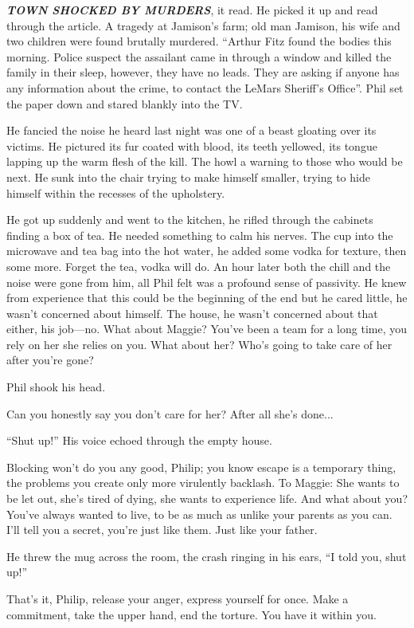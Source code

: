 \emph{\textbf{TOWN SHOCKED BY MURDERS}}, it read. He picked it up and
read through the article. A tragedy at Jamison's farm; old man Jamison,
his wife and two children were found brutally murdered. ``Arthur Fitz
found the bodies this morning. Police suspect the assailant came in
through a window and killed the family in their sleep, however, they
have no leads. They are asking if anyone has any information about the
crime, to contact the LeMars Sheriff's Office''. Phil set the paper down
and stared blankly into the TV.

He fancied the noise he heard last night was one of a beast gloating
over its victims. He pictured its fur coated with blood, its teeth
yellowed, its tongue lapping up the warm flesh of the kill. The howl a
warning to those who would be next. He sunk into the chair trying to
make himself smaller, trying to hide himself within the recesses of the
upholstery.

He got up suddenly and went to the kitchen, he rifled through the
cabinets finding a box of tea. He needed something to calm his nerves.
The cup into the microwave and tea bag into the hot water, he added some
vodka for texture, then some more. Forget the tea, vodka will do. An
hour later both the chill and the noise were gone from him, all Phil
felt was a profound sense of passivity. He knew from experience that
this could be the beginning of the end but he cared little, he wasn't
concerned about himself. The house, he wasn't concerned about that
either, his job---no. What about Maggie? You've been a team for a long
time, you rely on her she relies on you. What about her? Who's going to
take care of her after you're gone?

Phil shook his head.

Can you honestly say you don't care for her? After all she's done...

``Shut up!'' His voice echoed through the empty house.

Blocking won't do you any good, Philip; you know escape is a temporary
thing, the problems you create only more virulently backlash. To Maggie:
She wants to be let out, she's tired of dying, she wants to experience
life. And what about you? You've always wanted to live, to be as much as
unlike your parents as you can. I'll tell you a secret, you're just like
them. Just like your father.

He threw the mug across the room, the crash ringing in his ears, ``I
told you, shut up!''

That's it, Philip, release your anger, express yourself for once. Make a
commitment, take the upper hand, end the torture. You have it within
you.

